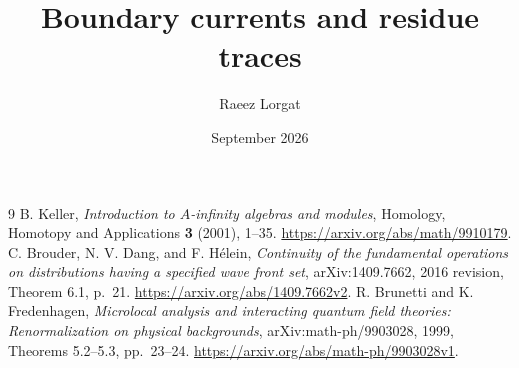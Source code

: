 \documentclass[11pt,twoside,openany]{memoir}
\title{Boundary currents and residue traces}
\author{Raeez Lorgat}
\date{September 2026}
\begin{document}
\maketitle





\begin{thebibliography}{9}
 B. Keller,
\emph{Introduction to $A$-infinity algebras and modules},
Homology, Homotopy and Applications \textbf{3} (2001), 1--35.
\url{https://arxiv.org/abs/math/9910179}.
 C. Brouder, N. V. Dang, and F. H\'elein,
\emph{Continuity of the fundamental operations on distributions having a
specified wave front set}, arXiv:1409.7662, 2016 revision,
Theorem 6.1, p.~21.
\url{https://arxiv.org/abs/1409.7662v2}.
 R. Brunetti and K. Fredenhagen,
\emph{Microlocal analysis and interacting quantum field theories:
Renormalization on physical backgrounds}, arXiv:math-ph/9903028, 1999,
Theorems 5.2--5.3, pp.~23--24.
\url{https://arxiv.org/abs/math-ph/9903028v1}.
\end{thebibliography}
\end{document}

